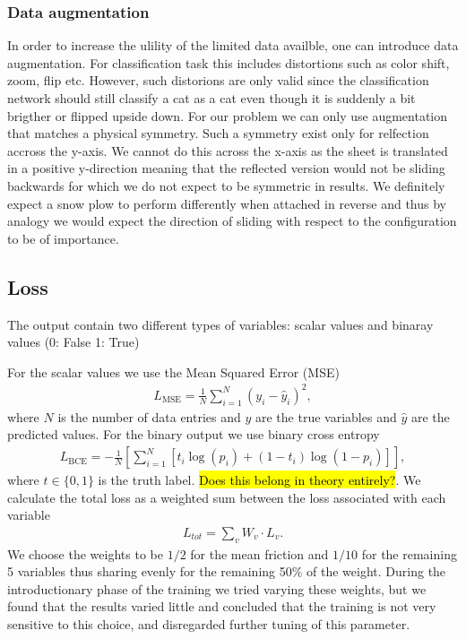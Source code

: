 \subsubsection{Data augmentation}
In order to increase the ulility of the limited data availble, one can introduce data augmentation. For classification task this includes distortions such as color shift, zoom, flip etc. However, such distorions are only valid since the classification network should still classify a cat as a cat even though it is suddenly a bit brigther or flipped upside down. For our problem we can only use augmentation that matches a physical symmetry. Such a symmetry exist only for relfection accross the y-axis. We cannot do this across the
x-axis as the sheet is translated in a positive y-direction meaning that the reflected version would not be sliding backwards for which we do not expect to be symmetric in results. We definitely expect a snow plow to perform differently when attached in reverse and thus by analogy we would expect the direction of sliding with respect to the configuration to be of importance. 

\subsection{Loss}
The output contain two different types of variables: scalar values and binaray values (0: False 1: True)

For the scalar values we use the Mean Squared Error (\acrshort{MSE})
\begin{align*}
  L_{\text{MSE}} = \frac{1}{N} \sum_{i = 1}^N (y_i - \hat{y}_i)^2,
\end{align*}
where $N$ is the number of data entries and $y$ are the true variables and
$\hat{y}$ are the predicted values. For the binary output we use binary cross entropy 
\begin{align*}
  L_{\text{BCE}} = -\frac{1}{N} \left[\sum_{i = 1}^N [t_i\log{(p_i)} + (1-t_i)\log{(1 - p_i)}]\right],
\end{align*}
where $t\in \{0,1\}$ is the truth label. \hl{Does this belong in theory
entirely?}. We calculate the total loss as a weighted sum between the loss associated with
each variable
\begin{align*}
  L_{tot} = \sum_{v} W_v\cdot L_v.
\end{align*}
We choose the weights to be $1/2$ for the mean friction and $1/10$ for the
remaining 5 variables thus sharing evenly for the remaining 50\% of the weight. During the introductionary phase of the training we tried varying these weights,
but we found that the results varied little and concluded that the training is not very sensitive to this choice, and disregarded further tuning of this parameter. 

